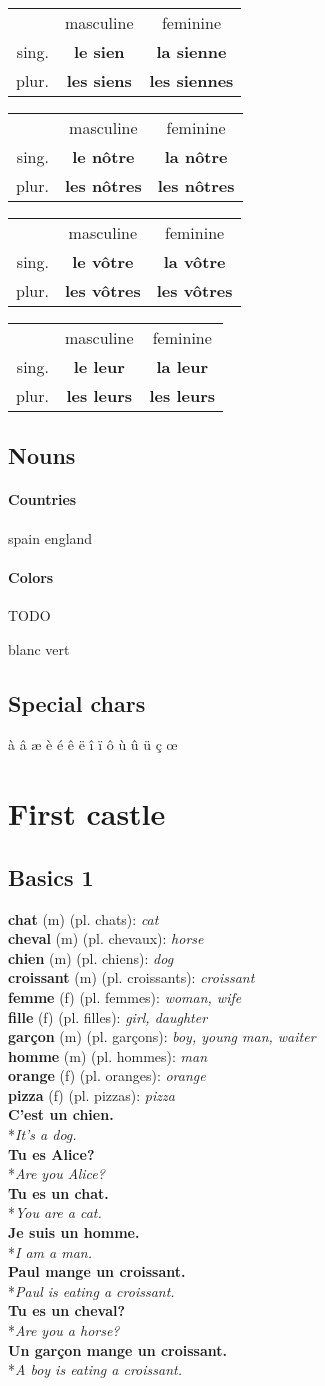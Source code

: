 \documentclass[a4paper,11pt,oneside]{book}
\newcommand{\phrase}[2]{\noindent\textbf{#1}\\*\-\hspace{0.5cm}\textit{#2}\\}
\newcommand{\noundecl}[4]{
\begin{tabular}{rcc}
 & masculine & feminine \\
 sing. & \textbf{#1} & \textbf{#2} \\
 plur. & \textbf{#3} & \textbf{#4}
\end{tabular}
}
\newcommand{\noundef}[4]{\textbf{#1} (#3) (pl. #2): \textit{#4}\\}
\begin{document}
\noundecl{le sien}{la sienne}{les siens}{les siennes}
\noundecl{le nôtre}{la nôtre}{les nôtres}{les nôtres}

\noundecl{le vôtre}{la vôtre}{les vôtres}{les vôtres}
\noundecl{le leur}{la leur}{les leurs}{les leurs}

\section{Nouns}

\subsubsection{Countries}

spain
england

\subsubsection{Colors}

TODO

blanc
vert


\section{Special chars}

à
â
æ
è
é
ê
ë
î
ï
ô
ù
û
ü
ç
œ


\chapter{First castle}

\section{Basics 1}

\noundef{chat}{chats}{m}{cat}
\noundef{cheval}{chevaux}{m}{horse}
\noundef{chien}{chiens}{m}{dog}
\noundef{croissant}{croissants}{m}{croissant}
\noundef{femme}{femmes}{f}{woman, wife}
\noundef{fille}{filles}{f}{girl, daughter}
\noundef{garçon}{garçons}{m}{boy, young man, waiter}
\noundef{homme}{hommes}{m}{man}
\noundef{orange}{oranges}{f}{orange}
\noundef{pizza}{pizzas}{f}{pizza}

\phrase{C'est un chien.}{It's a dog.}
\phrase{Tu es Alice?}{Are you Alice?}
\phrase{Tu es un chat.}{You are a cat.}
\phrase{Je suis un homme.}{I am a man.}
\phrase{Paul mange un croissant.}{Paul is eating a croissant.}
\phrase{Tu es un cheval?}{Are you a horse?}
\phrase{Un garçon mange un croissant.}{A boy is eating a croissant.}
\end{document}

